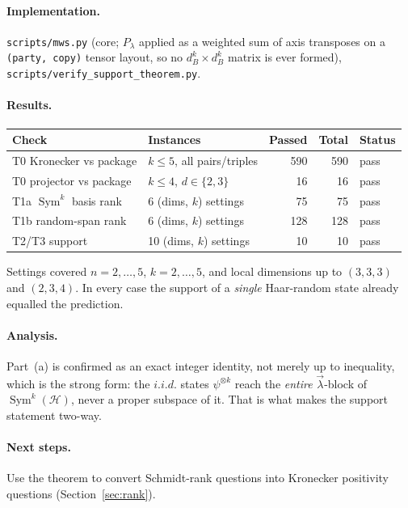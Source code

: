 \documentclass[11pt]{article}
\theoremstyle{definition}
\theoremstyle{remark}
\newcommand{\bmlam}{\vec{\lambda}}
\newcommand{\Sym}{\operatorname{Sym}}
\newcommand{\Hil}{\mathcal{H}}
\begin{document}
\paragraph{Implementation.}
\texttt{scripts/mws.py} (core; $P_\lambda$ applied as a weighted sum of axis
transposes on a \texttt{(party, copy)} tensor layout, so no $d_B^k \times d_B^k$ matrix
is ever formed), \texttt{scripts/verify\_support\_theorem.py}.

\paragraph{Results.}
{
\setlength{\tabcolsep}{8pt}
\renewcommand{\arraystretch}{1.2}
\begin{tabular}{llrrl}
\toprule
Check & Instances & Passed & Total & Status \\
\midrule
T0 Kronecker vs package        & $k \le 5$, all pairs/triples & 590 & 590 & pass \\
T0 projector vs package        & $k \le 4$, $d \in \{2,3\}$   & 16  & 16  & pass \\
T1a $\Sym^k$ basis rank        & 6 (dims, $k$) settings       & 75  & 75  & pass \\
T1b random-span rank           & 6 (dims, $k$) settings       & 128 & 128 & pass \\
T2/T3 support                  & 10 (dims, $k$) settings      & 10  & 10  & pass \\
\bottomrule
\end{tabular}
}

\medskip
\noindent Settings covered $n = 2,\dots,5$, $k = 2,\dots,5$, and local dimensions up to
$(3,3,3)$ and $(2,3,4)$. In every case the support of a \emph{single} Haar-random state
already equalled the prediction.

\paragraph{Analysis.}
Part~(a) is confirmed as an exact integer identity, not merely up to inequality, which
is the strong form: the $i.i.d.$ states $\psi^{\otimes k}$ reach the \emph{entire}
$\bmlam$-block of $\Sym^k(\Hil)$, never a proper subspace of it. That is what makes the
support statement two-way.

\paragraph{Next steps.}
Use the theorem to convert Schmidt-rank questions into Kronecker positivity questions
(Section~\ref{sec:rank}).
\end{document}
